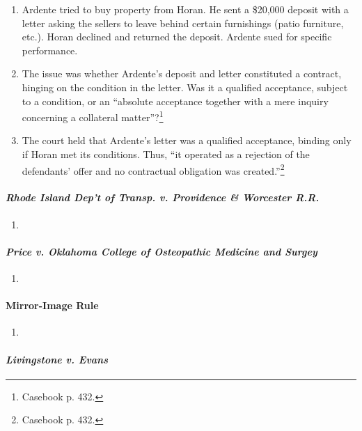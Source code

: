 \begin{enumerate}
    \item Ardente tried to buy property from Horan. He sent a \$20,000 deposit 
    with a letter asking the sellers to leave behind certain furnishings 
    (patio furniture, etc.). Horan declined and returned the deposit. Ardente 
    sued for specific performance.
    \item The issue was whether Ardente's deposit and letter constituted a 
    contract, hinging on the condition in the letter. Was it a qualified 
    acceptance, subject to a condition, or an ``absolute acceptance together 
    with a mere inquiry concerning a collateral matter''?\footnote{Casebook 
    p. 432.}
    \item The court held that Ardente's letter was a qualified acceptance, 
    binding only if Horan met its conditions. Thus, ``it operated as a 
    rejection of the defendants' offer and no contractual obligation was 
    created.''\footnote{Casebook p. 432.}
\end{enumerate}

\paragraph{\emph{Rhode Island Dep't of Transp. v. Providence \& Worcester 
R.R.}}

\begin{enumerate}
    \item %
\end{enumerate}

\paragraph{\emph{Price v. Oklahoma College of Osteopathic Medicine and Surgey}}

\begin{enumerate}
    \item %
\end{enumerate}

\paragraph{Mirror-Image Rule}

\begin{enumerate}
    \item %
\end{enumerate}

\paragraph{\emph{Livingstone v. Evans}}

